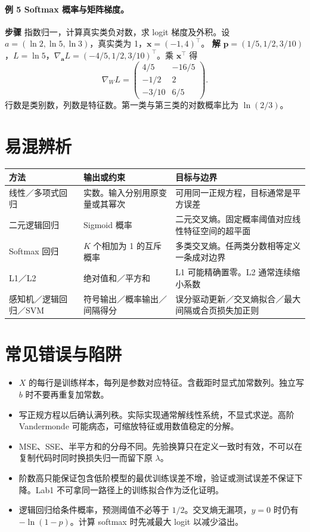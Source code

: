 \documentclass[UTF8,a4paper,zihao=-4,fontset=fandol]{ctexrep}
\begin{document}
\paragraph{例 5 Softmax 概率与矩阵梯度。}
\textbf{步骤} 指数归一，计算真实类负对数，求 logit 梯度及外积。设 \(a=(\ln2,\ln5,\ln3)\)，真实类为 1，\(\bm x=(-1,4)^\top\)。
\textbf{解} \(\bm p=(1/5,1/2,3/10)\)，\(L=\ln 5\)，\(\nabla_{\bm a}L=(-4/5,1/2,3/10)^\top\)。乘 \(\bm x^\top\) 得
\[
 \nabla_WL=
 \begin{pmatrix}4/5&-16/5\\-1/2&2\\-3/10&6/5\end{pmatrix}.
\]
行数是类别数，列数是特征数。第一类与第三类的对数概率比为 \(\ln(2/3)\)。

\section{易混辨析}
\noindent\begin{tabularx}{\linewidth}{@{}p{.22\linewidth}XX@{}}
\toprule
方法 & 输出或约束 & 目标与边界\\
\midrule
线性／多项式回归 & 实数。输入分别用原变量或其幂次 & 可用同一正规方程，目标通常是平方误差\\
二元逻辑回归 & Sigmoid 概率 & 二元交叉熵。固定概率阈值对应线性特征空间的超平面\\
Softmax 回归 & \(K\) 个相加为 1 的互斥概率 & 多类交叉熵。任两类分数相等定义一条成对边界\\
L1／L2 & 绝对值和／平方和 & L1 可能精确置零。L2 通常连续缩小系数\\
感知机／逻辑回归／SVM & 符号输出／概率输出／间隔得分 & 误分驱动更新／交叉熵拟合／最大间隔或合页损失加正则\\
\bottomrule
\end{tabularx}

\section{常见错误与陷阱}
\begin{itemize}[leftmargin=2em]
\item \(X\) 的每行是训练样本，每列是参数对应特征。含截距时显式加常数列。独立写 \(b\) 时不要再重复加常数。
\item 写正规方程以后确认满列秩。实际实现通常解线性系统，不显式求逆。高阶 Vandermonde 可能病态，可缩放特征或用数值稳定的分解。
\item MSE、SSE、半平方和的分母不同。先验换算只在定义一致时有效，不可以在复制代码时同时换损失归一而留下原 \(\lambda\)。
\item 阶数高只能保证包含低阶模型的最优训练误差不增，验证或测试误差不保证下降。Lab1 不可拿同一路径上的训练拟合作为泛化证明。
\item 逻辑回归给条件概率，预测阈值不必等于 \(1/2\)。交叉熵无漏项，\(y=0\) 时仍有 \(-\ln(1-p)\)。计算 softmax 时先减最大 logit 以减少溢出。
\end{itemize}
\end{document}
